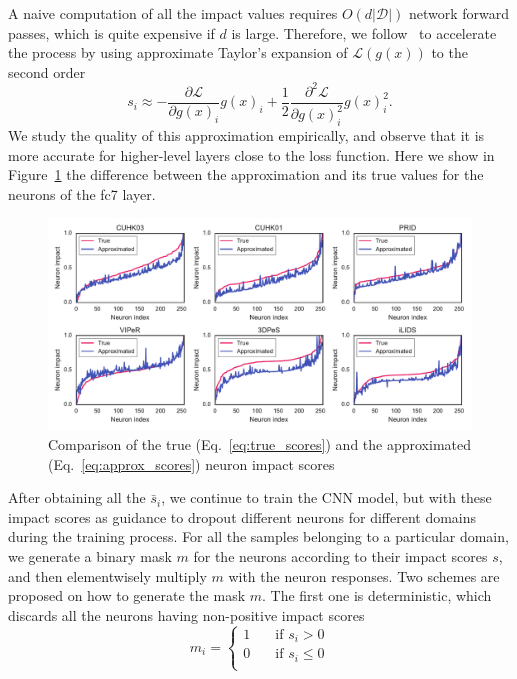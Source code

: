A naive computation of all the impact values requires $O(d|\mathcal{D}|)$ network forward passes, which is quite expensive if $d$ is large. Therefore, we follow~\cite{simonyan2013deep} to accelerate the process by using approximate Taylor's expansion of $\mathcal{L}(g(x))$ to the second order
\begin{equation} \label{eq:approx_scores}
   s_i\approx -\frac{\partial \mathcal{L}}{\partial g(x)_i} g(x)_i + \frac{1}{2} \frac{\partial^2 \mathcal{L}}{\partial g(x)_i^2} g(x)_i^2.
\end{equation}
We study the quality of this approximation empirically, and observe that it is more accurate for higher-level layers close to the loss function. Here we show in Figure~\ref{fig:impact_true_vs_approx} the difference between the approximation and its true values for the neurons of the fc7 layer.

\begin{figure}[t]
\begin{center}
\includegraphics[width=1.0\linewidth]{figures/multi_domain/impact_true_vs_approx.pdf}
\end{center}
\caption{Comparison of the true (Eq.~\eqref{eq:true_scores}) and the approximated (Eq.~\eqref{eq:approx_scores}) neuron impact scores}
\label{fig:impact_true_vs_approx}
\end{figure}

After obtaining all the $\bar{s}_i$, we continue to train the CNN model, but with these impact scores as guidance to dropout different neurons for different domains during the training process. For all the samples belonging to a particular domain, we generate a binary mask $m$ for the neurons according to their impact scores $s$, and then elementwisely multiply $m$ with the neuron responses. Two schemes are proposed on how to generate the mask $m$. The first one is deterministic, which discards all the neurons having non-positive impact scores
\begin{equation}
   m_i=\begin{cases}
      1 & \quad \text{if } s_i > 0\\
      0 & \quad \text{if } s_i \le 0\\
   \end{cases}
\end{equation}

